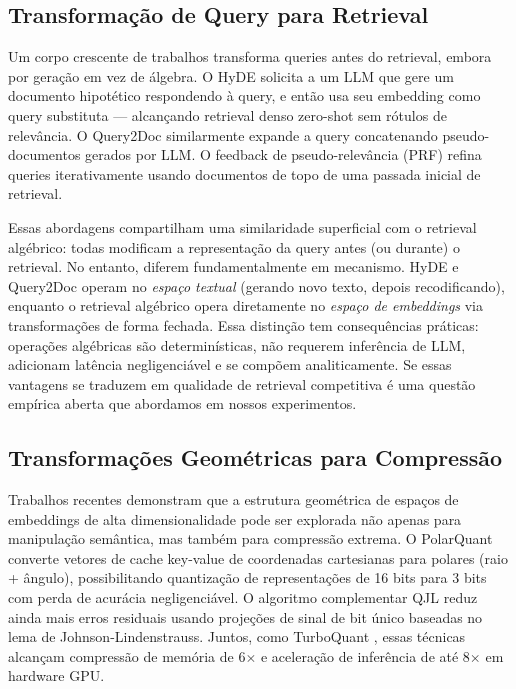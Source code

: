 \documentclass{article}
\begin{document}
\subsection{Transformação de Query para Retrieval}

Um corpo crescente de trabalhos transforma queries antes do retrieval, embora por geração em vez de álgebra. O HyDE \cite{gao2023hyde} solicita a um LLM que gere um documento hipotético respondendo à query, e então usa seu embedding como query substituta --- alcançando retrieval denso zero-shot sem rótulos de relevância. O Query2Doc \cite{wang2023query2doc} similarmente expande a query concatenando pseudo-documentos gerados por LLM. O feedback de pseudo-relevância (PRF) \cite{rocchio1971} refina queries iterativamente usando documentos de topo de uma passada inicial de retrieval.

Essas abordagens compartilham uma similaridade superficial com o retrieval algébrico: todas modificam a representação da query antes (ou durante) o retrieval. No entanto, diferem fundamentalmente em mecanismo. HyDE e Query2Doc operam no \emph{espaço textual} (gerando novo texto, depois recodificando), enquanto o retrieval algébrico opera diretamente no \emph{espaço de embeddings} via transformações de forma fechada. Essa distinção tem consequências práticas: operações algébricas são determinísticas, não requerem inferência de LLM, adicionam latência negligenciável e se compõem analiticamente. Se essas vantagens se traduzem em qualidade de retrieval competitiva é uma questão empírica aberta que abordamos em nossos experimentos.

\subsection{Transformações Geométricas para Compressão}

Trabalhos recentes demonstram que a estrutura geométrica de espaços de embeddings de alta dimensionalidade pode ser explorada não apenas para manipulação semântica, mas também para compressão extrema. O PolarQuant \cite{polarquant2026} converte vetores de cache key-value de coordenadas cartesianas para polares (raio + ângulo), possibilitando quantização de representações de 16 bits para 3 bits com perda de acurácia negligenciável. O algoritmo complementar QJL \cite{qjl2026} reduz ainda mais erros residuais usando projeções de sinal de bit único baseadas no lema de Johnson-Lindenstrauss. Juntos, como TurboQuant \cite{turboquant2026}, essas técnicas alcançam compressão de memória de 6$\times$ e aceleração de inferência de até 8$\times$ em hardware GPU.
\end{document}

